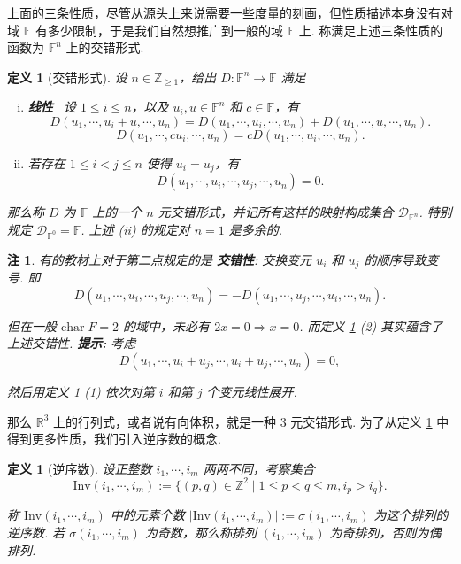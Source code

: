 \documentclass[10pt,openany]{article}
\theoremstyle{thmstyle} %
\theoremstyle{defstyle} %
\newtheorem{definition}[theorem]{定义}
\theoremstyle{prostyle} %
\theoremstyle{exastyle}
\theoremstyle{remstyle}
\newtheorem{remark}[theorem]{注}
\newcommand{\F}{\mathbb{F}}
\newcommand{\R}{\mathbb{R}}
\newcommand{\tz}{\mathrm{char} \;}
\begin{document}
上面的三条性质，尽管从源头上来说需要一些度量的刻画，但性质描述本身没有对域 \( \F \) 有多少限制，于是我们自然想推广到一般的域 \( \F \) 上. 称满足上述三条性质的函数为 \( \F^n \) 上的交错形式.
 
\begin{definition}[交错形式] \label{2.3.23}
	设 \( n \in \mathbb{Z}_{\geq 1}\)，给出 \( D: \F^n \to \F \) 满足
	\begin{enumerate}[(i)]
		\item \textbf{线性} \ 设 \( 1 \leq i \leq n \)，以及 \( u_i,u \in \F^n \) 和 \( c \in \F \)，有
		\[ D(u_1,\cdots,u_i+u,\cdots,u_n)=D(u_1,\cdots,u_i,\cdots,u_n)+D(u_1,\cdots,u,\cdots,u_n). \]
		\[ D(u_1,\cdots,cu_i,\cdots,u_n)=cD(u_1,\cdots,u_i,\cdots,u_n). \]
		
		\item 若存在 \( 1 \leq i<j \leq n \) 使得 \( u_i=u_j \)，有
		\[ D(u_1,\cdots,u_i,\cdots,u_j,\cdots,u_n)=0. \]
	\end{enumerate}
	
    那么称 \( D \) 为 \( \F \) 上的一个 \( n \) 元交错形式，并记所有这样的映射构成集合 \( \mathcal{D}_{\F^n} \). 特别规定 \( \mathcal{D}_{\F^0}=\F \). 上述 (ii) 的规定对 \( n=1 \) 是多余的.
\end{definition}

\begin{remark} \label{2.3.24}
	有的教材上对于第二点规定的是 \textbf{交错性}: 交换变元 \(u_i \) 和 \( u_j \) 的顺序导致变号. 即
	\[  D(u_1,\cdots,u_i,\cdots,u_j,\cdots,u_n)=- D(u_1,\cdots,u_j,\cdots,u_i,\cdots,u_n). \]
	
	但在一般 \( \tz F=2 \) 的域中，未必有 \( 2x=0 \Rightarrow x=0 \). 而定义 \ref{2.3.23} (2) 其实蕴含了上述交错性. \textbf{提示: }考虑
	\[ D(u_1,\cdots,u_i+u_j,\cdots,u_i+u_j,\cdots,u_n)=0, \]
	
	然后用定义 \ref{2.3.23} (1) 依次对第 \( i \) 和第 \( j \) 个变元线性展开.
\end{remark}

那么 \( \R^3 \) 上的行列式，或者说有向体积，就是一种 \( 3 \) 元交错形式. 为了从定义 \ref{2.3.23} 中得到更多性质，我们引入逆序数的概念.

\begin{definition}[逆序数] \label{2.3.25}
	设正整数 \( i_1,\cdots,i_m \) 两两不同，考察集合
	\[ \text{Inv}(i_1,\cdots,i_m):=\{(p,q) \in \mathbb{Z}^2 \mid 1 \leq p<q \leq m, i_p>i_q \}. \]
	
	称 \( \text{Inv}(i_1,\cdots,i_m) \) 中的元素个数 \( |\text{Inv}(i_1,\cdots,i_m)|:= \sigma(i_1,\cdots,i_m) \) 为这个排列的逆序数. 若 \( \sigma(i_1,\cdots,i_m) \) 为奇数，那么称排列 \( (i_1,\cdots,i_m) \) 为奇排列，否则为偶排列.
\end{definition}
\end{document}
